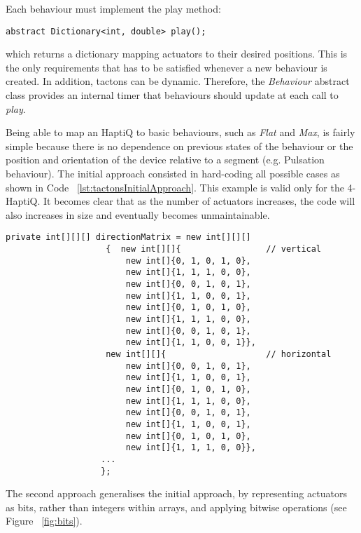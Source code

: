 Each behaviour must implement the play method:

\lstset{style=sharpc1}
\begin{lstlisting}
abstract Dictionary<int, double> play();
\end{lstlisting}

which returns a dictionary mapping actuators to their desired positions. 
This is the only requirements that has to be satisfied whenever a new behaviour is created. In addition, tactons can be dynamic. Therefore, the \textit{Behaviour} abstract class provides an internal timer that behaviours should update at each call to \textit{play}. 

Being able to map an HaptiQ to basic behaviours, such as \textit{Flat} and \textit{Max}, is fairly simple because there is no dependence on previous states of the behaviour or the position and orientation of the device relative to a segment (e.g. Pulsation behaviour). The initial approach consisted in hard-coding all possible cases as shown in Code ~\ref{lst:tactonsInitialApproach}. This example is valid only for the 4-HaptiQ. It becomes clear that as the number of actuators increases, the code will also increases in size and eventually becomes unmaintainable. 

\lstset{style=sharpc1}
\begin{lstlisting}[caption={Tactons - Initial approach},label={lst:tactonsInitialApproach}]
private int[][][] directionMatrix = new int[][][]
                    {  new int[][]{                 // vertical 
                        new int[]{0, 1, 0, 1, 0}, 
                        new int[]{1, 1, 1, 0, 0}, 
                        new int[]{0, 0, 1, 0, 1}, 
                        new int[]{1, 1, 0, 0, 1}, 
                        new int[]{0, 1, 0, 1, 0}, 
                        new int[]{1, 1, 1, 0, 0}, 
                        new int[]{0, 0, 1, 0, 1}, 
                        new int[]{1, 1, 0, 0, 1}}, 
                    new int[][]{                    // horizontal
                        new int[]{0, 0, 1, 0, 1},
                        new int[]{1, 1, 0, 0, 1},
                        new int[]{0, 1, 0, 1, 0},
                        new int[]{1, 1, 1, 0, 0},
                        new int[]{0, 0, 1, 0, 1},
                        new int[]{1, 1, 0, 0, 1},
                        new int[]{0, 1, 0, 1, 0},
                        new int[]{1, 1, 1, 0, 0}},
                   ...
                   };
\end{lstlisting}

The second approach generalises the initial approach, by representing actuators as bits, rather than integers within arrays, and applying bitwise operations (see Figure ~\ref{fig:bits}). 

